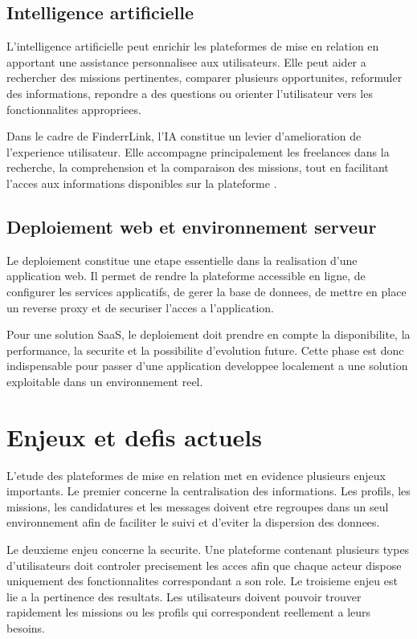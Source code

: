\subsection{Intelligence artificielle}

L'intelligence artificielle peut enrichir les plateformes de mise en relation en apportant une assistance personnalisee aux utilisateurs. Elle peut aider a rechercher des missions pertinentes, comparer plusieurs opportunites, reformuler des informations, repondre a des questions ou orienter l'utilisateur vers les fonctionnalites appropriees.

Dans le cadre de FinderrLink, l'IA constitue un levier d'amelioration de l'experience utilisateur. Elle accompagne principalement les freelances dans la recherche, la comprehension et la comparaison des missions, tout en facilitant l'acces aux informations disponibles sur la plateforme \cite{gemini}.

\subsection{Deploiement web et environnement serveur}

Le deploiement constitue une etape essentielle dans la realisation d'une application web. Il permet de rendre la plateforme accessible en ligne, de configurer les services applicatifs, de gerer la base de donnees, de mettre en place un reverse proxy et de securiser l'acces a l'application.

Pour une solution SaaS, le deploiement doit prendre en compte la disponibilite, la performance, la securite et la possibilite d'evolution future. Cette phase est donc indispensable pour passer d'une application developpee localement a une solution exploitable dans un environnement reel.

\section{Enjeux et defis actuels}

L'etude des plateformes de mise en relation met en evidence plusieurs enjeux importants. Le premier concerne la centralisation des informations. Les profils, les missions, les candidatures et les messages doivent etre regroupes dans un seul environnement afin de faciliter le suivi et d'eviter la dispersion des donnees.

Le deuxieme enjeu concerne la securite. Une plateforme contenant plusieurs types d'utilisateurs doit controler precisement les acces afin que chaque acteur dispose uniquement des fonctionnalites correspondant a son role. Le troisieme enjeu est lie a la pertinence des resultats. Les utilisateurs doivent pouvoir trouver rapidement les missions ou les profils qui correspondent reellement a leurs besoins.

